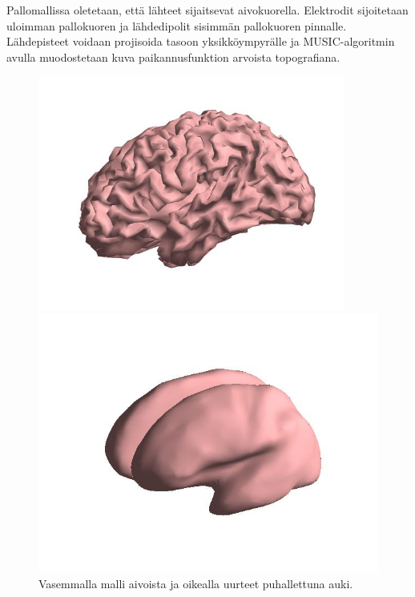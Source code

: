 Pallomallissa oletetaan, että lähteet sijaitsevat aivokuorella. Elektrodit sijoitetaan uloimman pallokuoren ja lähdedipolit sisimmän pallokuoren pinnalle. Lähdepisteet voidaan projisoida tasoon yksikköympyrälle ja MUSIC-algoritmin avulla muodostetaan kuva paikannusfunktion arvoista topografiana.

\begin{figure}[hb]
    \begin{minipage}{0.5\textwidth}
        \centering
        \includegraphics[width=0.9\textwidth]{aivot2.jpg}
    \end{minipage}
    \begin{minipage}{0.5\textwidth}
        \centering
        \includegraphics[width=\textwidth]{aivot.jpg}
    \end{minipage}
    \caption{Vasemmalla malli aivoista ja oikealla uurteet puhallettuna auki.}
    \label{fig:aivot}
\end{figure}
